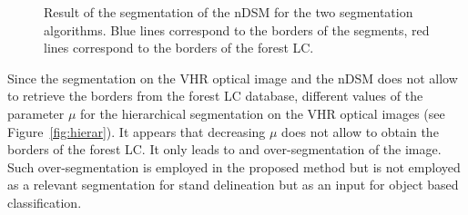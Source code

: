 \begin{figure}[htbp]
\begin{center}
\begingroup
\captionsetup[subfigure]{width=0.4\textwidth}
\hspace*{0.05\textwidth}
\endgroup
\caption{Result of the segmentation of the nDSM for the two segmentation algorithms. Blue lines correspond to the borders of the segments, red lines correspond to the borders of the forest LC.}
\label{fig:seg_nDSM}
\end{center}
\end{figure}

Since the segmentation on the VHR optical image and the nDSM does not allow to retrieve the borders from the forest LC database, different values of the parameter $\mu$ for the hierarchical segmentation on the VHR optical images (see Figure~\ref{fig:hierar}). It appears that decreasing $\mu$ does not allow to obtain the borders of the forest LC. It only leads to and over-segmentation of the image. Such over-segmentation is employed in the proposed method but is not employed as a relevant segmentation for stand delineation but as an input for object based classification.

